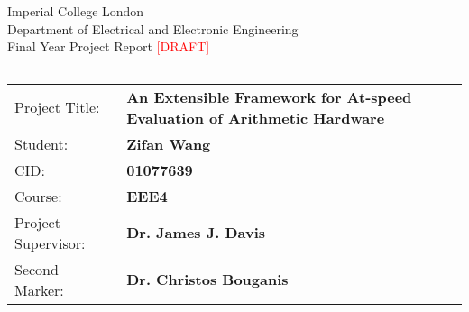 \begin{titlepage}
  { \Large
    Imperial College London\\[17pt]
    Department of Electrical and Electronic Engineering\\[17pt]
    Final Year Project Report \textcolor{red}{[DRAFT]}
  }

  \rule{\columnwidth}{3pt}
  \vfill
  \centering
  
  \vfill

  \begin{table}[h]
  \def\arraystretch{1.8}
    \begin{tabular}{p{40mm} >{\bfseries} p{\dimexpr\columnwidth-40mm}}
      Project Title: & An Extensible Framework for \newline At-speed Evaluation of Arithmetic Hardware \\
      Student:       & Zifan Wang \\
      CID:           & 01077639 \\
      Course:        & EEE4 \\
      Project Supervisor: & Dr. James J. Davis \\
      Second Marker: & Dr. Christos Bouganis
    \end{tabular}
  \end{table}
\end{titlepage}